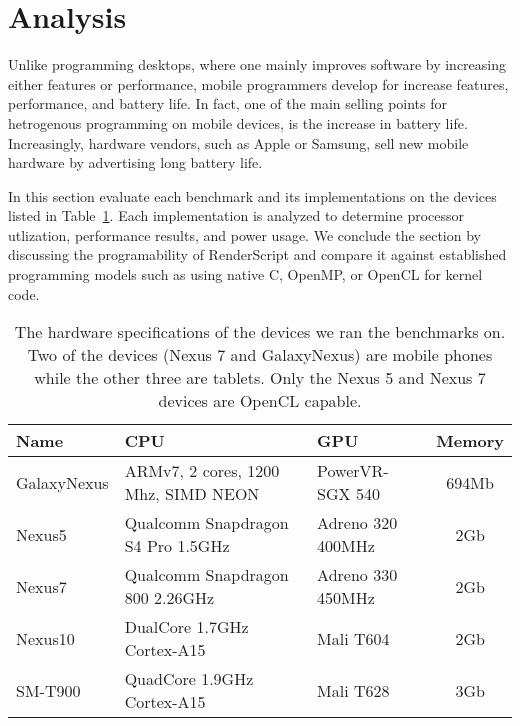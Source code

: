 \section{Analysis}
\label{sec:analysis}

Unlike programming desktops, where one mainly 
  improves software by increasing either features or performance,
  mobile programmers develop for increase features, performance, and 
  battery life.
In fact, one of the main selling points for hetrogenous
  programming on mobile devices, is the increase in battery life.
Increasingly, hardware vendors, such as Apple or Samsung, sell new
  mobile hardware by advertising long battery life.


In this section evaluate each benchmark and its implementations on the devices listed
  in Table~\ref{table:hardware}.
Each implementation is analyzed to determine processor utlization, performance
  results, and power usage.
We conclude the section by discussing the programability of RenderScript
  and compare it against established programming models such as using
  native C, OpenMP, or OpenCL for kernel code.


\begin{table}[h]\small
\centering
\begin{tabular}{ | l | p{2.3cm} | p{1.7cm} | c |}
    \hline 
    Name & CPU & GPU & Memory \\ \hline
    GalaxyNexus & ARMv7, 2 cores, 1200 Mhz, SIMD NEON & PowerVR-SGX 540 & 694Mb \\ \hline
    Nexus5 & Qualcomm Snapdragon S4 Pro 1.5GHz & Adreno 320 400MHz & 2Gb \\ \hline
    Nexus7 & Qualcomm Snapdragon 800 2.26GHz & Adreno 330 450MHz & 2Gb \\ \hline
    Nexus10 & DualCore 1.7GHz Cortex-A15 & Mali T604 & 2Gb \\ \hline
    SM-T900 & QuadCore 1.9GHz Cortex-A15 & Mali T628 & 3Gb \\ \hline
    \hline
\end{tabular}
\caption{The hardware specifications of the devices we ran the benchmarks on. Two of the devices (Nexus 7 and GalaxyNexus) are mobile phones while the other three are tablets. Only the Nexus 5 and Nexus 7 devices are OpenCL capable.}
\label{table:hardware}
\end{table}







